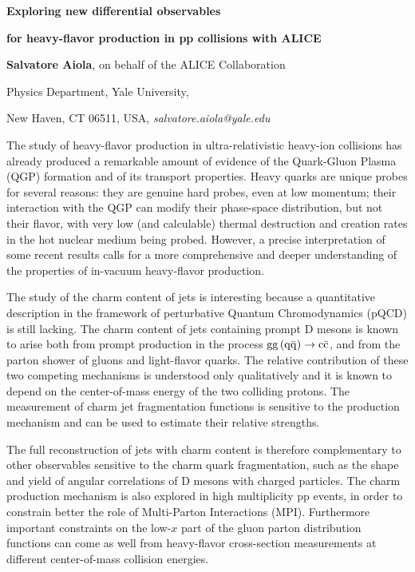 \documentclass[12pt]{article}
\begin{document}
\centerline{\bf 
Exploring new differential observables
}

\centerline{\bf 
for heavy-flavor production in pp collisions with ALICE
}

\vspace{12pt}

\centerline{ {\bf Salvatore Aiola}, on behalf of the ALICE Collaboration }

\vspace{12pt}

\centerline{Physics Department, Yale University,
}\centerline{New Haven, CT 06511, USA, {\it salvatore.aiola@yale.edu}}

\vspace{12pt}


\vspace{12pt} \vspace{12pt}
The study of heavy-flavor production in ultra-relativistic heavy-ion collisions has already produced
a remarkable amount of evidence of the Quark-Gluon Plasma (QGP) formation and of its transport properties. 
Heavy quarks are unique probes for several reasons: they are genuine hard probes, even at low momentum;
their interaction with the QGP can modify their phase-space distribution, but not their flavor, with very low
(and calculable) thermal destruction and creation rates in the hot nuclear medium being probed.
However, a precise interpretation of some recent results calls for a more comprehensive and deeper understanding
of the properties of in-vacuum heavy-flavor production.

The study of the charm content of jets is interesting because 
a quantitative description in the framework of perturbative
Quantum Chromodynamics (pQCD) is still lacking.
The charm content of jets containing prompt D mesons is known to arise both from prompt production 
in the process ${\rm gg\, (q\bar{q})} \rightarrow {\rm c\bar{c}}$, and
from the parton shower of gluons and light-flavor quarks.
The relative contribution of these two competing mechanisms is understood only qualitatively
and it is known to depend on the center-of-mass energy of the two colliding protons.
The measurement of charm jet fragmentation functions is sensitive to the production mechanism and 
can be used to estimate their relative strengths.

The full reconstruction of jets with charm content is therefore complementary to other observables sensitive to the charm quark fragmentation, 
such as the shape and yield of angular correlations of D mesons with
charged particles. The charm production mechanism is also explored in high multiplicity pp events,
in order to constrain better the role of Multi-Parton Interactions (MPI).
Furthermore important constraints on the low-$x$ part of the gluon parton distribution functions can come
as well from heavy-flavor cross-section measurements at different center-of-mass collision energies.
\end{document}
